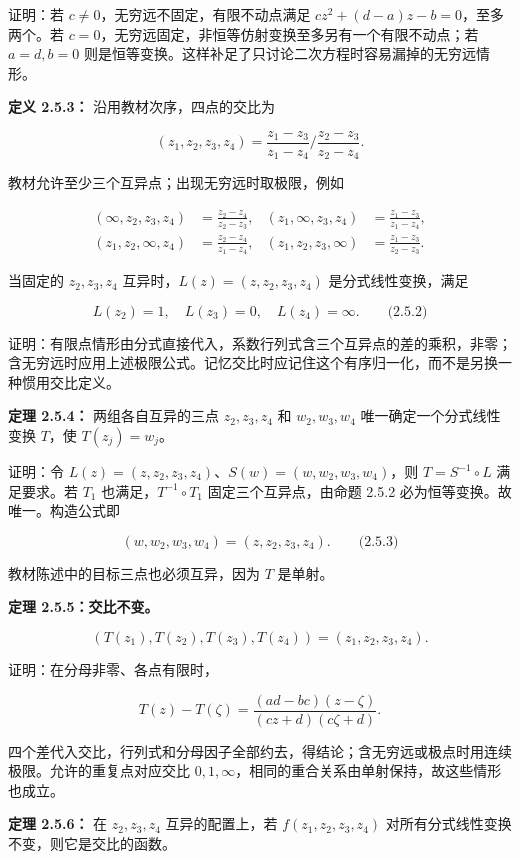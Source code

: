 \documentclass[11pt,a4paper]{article}
\begin{document}
证明：若 \(c\ne0\)，无穷远不固定，有限不动点满足
\(cz^2+(d-a)z-b=0\)，至多两个。若
\(c=0\)，无穷远固定，非恒等仿射变换至多另有一个有限不动点；若
\(a=d,b=0\)
则是恒等变换。这样补足了只讨论二次方程时容易漏掉的无穷远情形。

\textbf{定义 2.5.3：} 沿用教材次序，四点的交比为

\[
(z_1,z_2,z_3,z_4)=\frac{z_1-z_3}{z_1-z_4}\Big/\frac{z_2-z_3}{z_2-z_4}.
\]

教材允许至少三个互异点；出现无穷远时取极限，例如

\[
\begin{aligned}
(\infty,z_2,z_3,z_4)&=\frac{z_2-z_4}{z_2-z_3},&
(z_1,\infty,z_3,z_4)&=\frac{z_1-z_3}{z_1-z_4},\\
(z_1,z_2,\infty,z_4)&=\frac{z_2-z_4}{z_1-z_4},&
(z_1,z_2,z_3,\infty)&=\frac{z_1-z_3}{z_2-z_3}.
\end{aligned}
\]

当固定的 \(z_2,z_3,z_4\) 互异时，\(L(z)=(z,z_2,z_3,z_4)\)
是分式线性变换，满足

\[
L(z_2)=1,\quad L(z_3)=0,\quad L(z_4)=\infty.
\qquad\text{(2.5.2)}
\]

证明：有限点情形由分式直接代入，系数行列式含三个互异点的差的乘积，非零；含无穷远时应用上述极限公式。记忆交比时应记住这个有序归一化，而不是另换一种惯用交比定义。

\textbf{定理 2.5.4：} 两组各自互异的三点 \(z_2,z_3,z_4\) 和
\(w_2,w_3,w_4\) 唯一确定一个分式线性变换 \(T\)，使 \(T(z_j)=w_j\)。

证明：令 \(L(z)=(z,z_2,z_3,z_4)\)、\(S(w)=(w,w_2,w_3,w_4)\)，则
\(T=S^{-1}\circ L\) 满足要求。若 \(T_1\) 也满足，\(T^{-1}\circ T_1\)
固定三个互异点，由命题 2.5.2 必为恒等变换。故唯一。构造公式即

\[
(w,w_2,w_3,w_4)=(z,z_2,z_3,z_4).
\qquad\text{(2.5.3)}
\]

教材陈述中的目标三点也必须互异，因为 \(T\) 是单射。

\textbf{定理 2.5.5：交比不变。}

\[
(T(z_1),T(z_2),T(z_3),T(z_4))=(z_1,z_2,z_3,z_4).
\]

证明：在分母非零、各点有限时，

\[
T(z)-T(\zeta)=\frac{(ad-bc)(z-\zeta)}{(cz+d)(c\zeta+d)}.
\]

四个差代入交比，行列式和分母因子全部约去，得结论；含无穷远或极点时用连续极限。允许的重复点对应交比
\(0,1,\infty\)，相同的重合关系由单射保持，故这些情形也成立。

\textbf{定理 2.5.6：} 在 \(z_2,z_3,z_4\) 互异的配置上，若
\(f(z_1,z_2,z_3,z_4)\) 对所有分式线性变换不变，则它是交比的函数。
\end{document}
